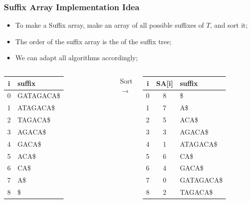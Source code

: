 \begin{frame}
  \frametitle{Suffix Array Implementation Idea}

    \begin{itemize}
    \item To make a Suffix array, make an array of all possible
      suffixes of $T$, and sort it;
    \item The order of the suffix array is the
       of the suffix tree;
    \item We can adapt all algorithms accordingly;
    \end{itemize}

  \begin{columns}
    \begin{tabular}{c|l}
      i & suffix\\
      \hline
      0 & GATAGACA\$\\
      1 & ATAGACA\$\\
      2 & TAGACA\$\\
      3 & AGACA\$\\
      4 & GACA\$\\
      5 & ACA\$\\
      6 & CA\$\\
      7 & A\$\\
      8 & \$\\
    \end{tabular}
    Sort $\rightarrow$
    \begin{tabular}{c|c|l}
      i & SA[i] & suffix \\
      \hline
      0 & 8 & \$\\
      1 & 7 & A\$\\
      2 & 5 & ACA\$\\
      3 & 3 & AGACA\$\\
      4 & 1 & ATAGACA\$\\
      5 & 6 & CA\$\\
      6 & 4 & GACA\$\\
      7 & 0 & GATAGACA\$\\
      8 & 2 & TAGACA\$\\
    \end{tabular}
  \end{columns}
\end{frame}

